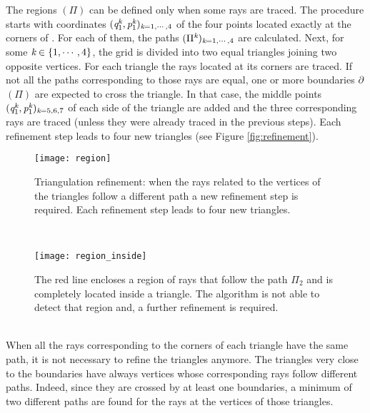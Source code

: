 The regions $(\Pi)$ can be defined only when some rays are traced.
The procedure starts with coordinates $(\textit{q}_1^{\textit{k}},\textit{p}_1^{\textit{k}})_{\textit{k}=1, \cdots, 4}$ of the four points located exactly at the corners of . For each of them, the paths $(\Pi^{\textit{k}})_{\textit{k}=1, \cdots, 4}$ are calculated. Next, for some $\textit{k} \in\{1, \cdots, 4\}$, the grid is divided into two equal triangles joining two opposite vertices. For each triangle the rays located at its corners are traced. If not all the paths corresponding to
those rays are equal, one or more boundaries
$\partial$$(\Pi)$ are expected to cross the triangle.
In that case, the middle points $(\textit{q}_1^{\textit{k}},\textit{p}_1^{\textit{k}})_{\textit{k}=5,6,7}$ of each side of the triangle are added and
the three corresponding rays are traced (unless they were already traced in the previous steps). Each refinement step leads to four new triangles (see Figure \ref{fig:refinement}).
 \begin{figure}[h]
 \begin{minipage}[h]{\textwidth}
\centering
    \texttt{[image: region]}
  \caption{Triangulation refinement:
  when the rays related to the vertices of the triangles follow a different path a new refinement step is required.
   Each refinement step leads to four new triangles.}
  \label{fig:refinement}
\end{minipage}\\
\begin{minipage}[h]{\textwidth}
\centering
    \texttt{[image: region\_inside]}
  \caption{The red line encloses a region of rays that follow the path $\Pi_2$ and is completely located inside a triangle.
  The algorithm is not able to detect that region and, a further refinement is required.}
   \label{fig:region inside}
\end{minipage}
  \end{figure} \\ \indent
When all the rays corresponding to the corners of each triangle have the same path, it is not necessary to refine the triangles anymore.
The triangles very close to the boundaries have always vertices whose corresponding rays follow different paths.
Indeed, since they are crossed by at least one boundaries, a minimum of two different paths are found for the rays at the vertices of those triangles. 
